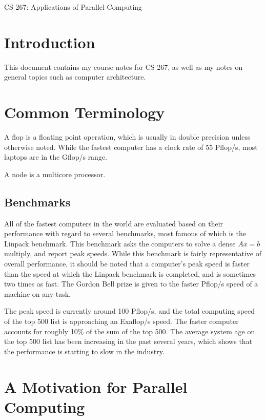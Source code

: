 \documentclass[10pt]{article}
\begin{document}
\begin{centering}
\Large CS 267: Applications of Parallel Computing\\
\end{centering}

\tableofcontents
\clearpage

\section{Introduction}
\begin{flushleft}\justify

This document contains my course notes for CS 267, as well as my notes on general topics such as computer architecture.

\section{Common Terminology}

A flop is a floating point operation, which is usually in double precision unless otherwise noted. While the fastest computer has a clock rate of 55 Pflop/s, most laptops are in the Gflop/s range. 

A node is a multicore processor.

\subsection{Benchmarks}

All of the fastest computers in the world are evaluated based on their performance with regard to several benchmarks, most famous of which is the Linpack benchmark. This benchmark asks the computers to solve a dense \(Ax=b\) multiply, and report peak speeds. While this benchmark is fairly representative of overall performance, it should be noted that a computer's peak speed is faster than the speed at which the Linpack benchmark is completed, and is sometimes two times as fast. The Gordon Bell prize is given to the faster Pflop/s speed of a machine on any task.

The peak speed is currently around 100 Pflop/s, and the total computing speed of the top 500 list is approaching an Exaflop/s speed. The faster computer accounts for roughly 10\% of the sum of the top 500. The average system age on the top 500 list has been increasing in the past several years, which shows that the performance is starting to slow in the industry.

\section{A Motivation for Parallel Computing}


\end{flushleft}
\end{document}
